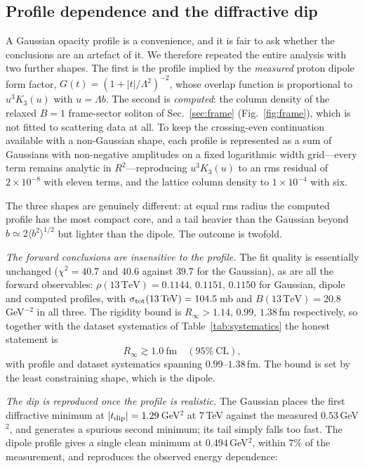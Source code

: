 \documentclass[aps,prd,preprint,nofootinbib,longbibliography]{revtex4-2}
\begin{document}
\subsection{Profile dependence and the diffractive dip}
\label{sec:profile}

A Gaussian opacity profile is a convenience, and it is fair to ask whether the
conclusions are an artefact of it. We therefore repeated the entire analysis with
two further shapes. The first is the profile implied by the \emph{measured}
proton dipole form factor, $G(t)=(1+|t|/\Lambda^2)^{-2}$, whose overlap function
is proportional to $u^3K_3(u)$ with $u=\Lambda b$. The second is
\emph{computed}: the column density of the relaxed $B=1$ frame-sector soliton of
Sec.~\ref{sec:frame} (Fig.~\ref{fig:frame}), which is not fitted to scattering
data at all. To keep the crossing-even continuation available with a non-Gaussian
shape, each profile is represented as a sum of Gaussians with non-negative
amplitudes on a fixed logarithmic width grid---every term remains analytic in
$R^2$---reproducing $u^3K_3(u)$ to an rms residual of $2\times10^{-8}$ with
eleven terms, and the lattice column density to $1\times10^{-4}$ with six.

The three shapes are genuinely different: at equal rms radius the computed
profile has the most compact core, and a tail heavier than the Gaussian beyond
$b\simeq2\langle b^2\rangle^{1/2}$ but lighter than the dipole. The outcome is
twofold.

\emph{The forward conclusions are insensitive to the profile.} The fit quality is
essentially unchanged ($\chi^2=40.7$ and $40.6$ against $39.7$ for the Gaussian),
as are all the forward observables:
$\rho(13\,\mathrm{TeV})=0.1144,\,0.1151,\,0.1150$ for Gaussian, dipole and
computed profiles, with
$\sigma_{\rm tot}(13\,\mathrm{TeV})=104.5\,$mb and
$B(13\,\mathrm{TeV})=20.8\,$GeV$^{-2}$ in all three. The rigidity bound is
$R_\infty>1.14,\,0.99,\,1.38\,$fm respectively, so together with
the dataset systematics of Table~\ref{tab:systematics} the honest statement is
\begin{equation}
R_\infty \gtrsim 1.0\ \mathrm{fm}\quad (95\%\ \mathrm{CL}),
\end{equation}
with profile and dataset systematics spanning $0.99$--$1.38\,$fm. The bound is
set by the least constraining shape, which is the dipole.

\emph{The dip is reproduced once the profile is realistic.} The Gaussian places
the first diffractive minimum at $|t_{\rm dip}|=1.29\,$GeV$^2$ at $7\,$TeV
against the measured $0.53\,$GeV$^2$, and generates a spurious second minimum;
its tail simply falls too fast. The dipole profile gives a single clean minimum
at $0.494\,$GeV$^2$, within $7\%$ of the measurement, and reproduces the observed
energy dependence:
\end{document}
